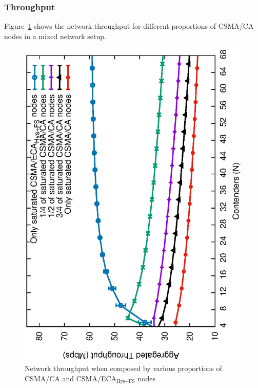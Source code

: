 	\subsubsection{Throughput}
	
	Figure~\ref{fig:mixedThroughput-sat} shows the network throughput for different proportions of CSMA/CA nodes in a mixed network setup.
	
	\begin{figure}[tb]
		\centering
		\includegraphics[width=0.7\linewidth,angle=-90]{figures/saturated/mixed/throughput-mixed/throughput-saturated-mixed-TON.eps}
		\caption{Network throughput when composed by various proportions of CSMA/CA and CSMA/ECA$_{\text{Hys+FS}}$ nodes}
		\label{fig:mixedThroughput-sat}
	\end{figure}
	
